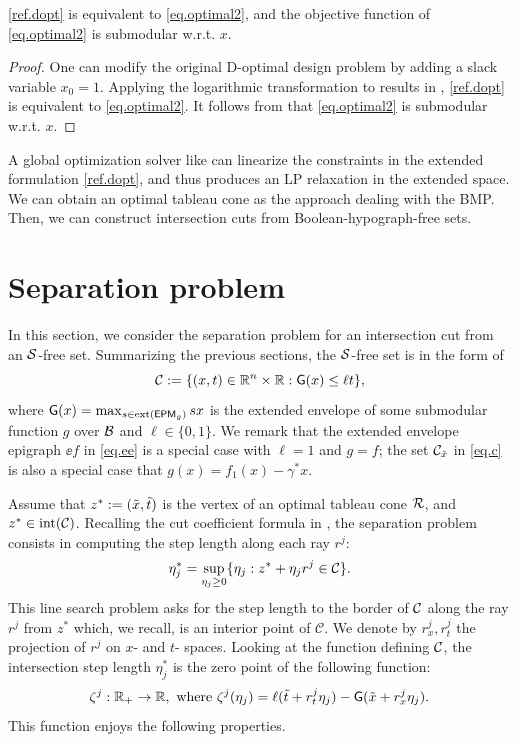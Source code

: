 \begin{proposition}
\eqref{ref.dopt} is equivalent to \eqref{eq.optimal2}, and the objective function of \eqref{eq.optimal2} is submodular w.r.t. $x$.
\end{proposition}
\begin{proof}
One can modify the original D-optimal design problem by adding a slack variable $x_0 = 1$.
Applying the logarithmic transformation to results in \cite{sagnol2015computing}, \eqref{ref.dopt} is equivalent to \eqref{eq.optimal2}.  It follows from  \cite{SAGNOL2013258,shamaiah2010greedy} that \eqref{eq.optimal2} is submodular w.r.t. $x$.
\end{proof}

A global optimization solver like \scip can linearize the constraints in the extended formulation \eqref{ref.dopt}, and thus produces an LP relaxation in the extended space. We can  obtain an optimal tableau cone as the approach dealing with the BMP. Then, we can construct intersection cuts from  Boolean-hypograph-free sets.


 
 
\section{Separation problem}
\label{sec.sep}
In this section,  we consider the separation problem for an intersection cut from an $\mathcal S$-free set. Summarizing the previous sections, the $\mathcal S$-free set is in the  form of $$
    \mathcal C := \{(x,t) \in \mathbb R^n \times \mathbb R: \mathsf{G}(x) \le \ell t\},
$$
where  $\mathsf{G}(x) = \max_{s \in \operatorname{ext}(\mathsf{EPM}_{g})} sx$ is the extended envelope of some submodular function $g$ over $\mathcal B$ and $ \ell \in \{0, 1\}$. We remark that the extended envelope epigraph $\ee{f}$ in \eqref{eq.ee} is a special case with $ \ell = 1$ and $g=f$; the set $\mathcal C_{\tilde{x}}$ in  \eqref{eq.c} is also a special case that $g(x)= f_1(x) - \gamma^\ast x$.

Assume that $z^\ast:=(\tilde{x}, \tilde{t})$ is the vertex of an optimal tableau cone $\mathcal R$, and $z^\ast \in \operatorname{int}(\mathcal C)$. Recalling the cut coefficient formula in , the separation problem consists in computing the step length along each ray $r^j$:
\begin{equation}
\label{eq.supstep}
\eta_j^\ast = \sup_{\eta_j \ge 0}\{\eta_j: z^\ast + \eta_j r^j \in \mathcal C\}.   
\end{equation}
This line search problem asks for the step length to the border of $\mathcal C$ along the ray $r^j$ from $z^\ast$ which, we recall, is an interior point of $\mathcal{C}$.   We denote by $r^j_x, r^j_t$ the projection of $r^j$ on $x$- and $t$- spaces. Looking at the function defining $\mathcal C$, the intersection step length $\eta_j^\ast$ is the zero point of the following function:
$$\zeta^j:\mathbb R_+ \to \mathbb R, \textup{ where } \zeta^j(\eta_j) = \ell  (\tilde{t} + r^j_t \eta_j) -  \mathsf{G}(\tilde{x} + r^j_x  \eta_j ).$$
This function enjoys the following properties.

